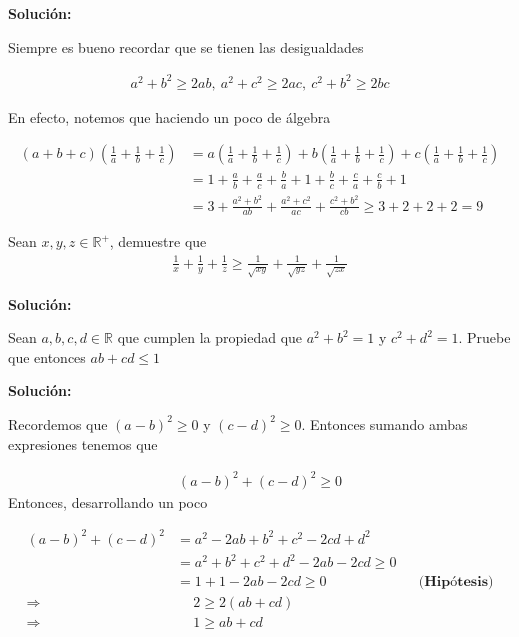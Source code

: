 \documentclass[12pt]{book}
\begin{document}
\textbf{Solución:}

Siempre es bueno recordar que se tienen las desigualdades

\begin{align*}
    a^2+b^2\geq2 ab, \ a^2+c^2\geq 2ac, \ c^2+b^2 \geq 2 bc
\end{align*}

En efecto, notemos que haciendo un poco de álgebra

\begin{align*}
    (a+b+c)\left(\frac{1}{a}+\frac{1}{b}+\frac{1}{c}\right)
    &=a \left(\frac{1}{a}+\frac{1}{b}+\frac{1}{c}\right)+b\left(\frac{1}{a}+\frac{1}{b}+\frac{1}{c}\right)+c\left(\frac{1}{a}+\frac{1}{b}+\frac{1}{c}\right) \\
    &=1+ \frac{a}{b}+\frac{a}{c}+\frac{b}{a}+1+\frac{b}{c}+\frac{c}{a}+\frac{c}{b}+1 \\
    &=3+\frac{a^2+b^2}{ab}+\frac{a^2+c^2}{ac}+\frac{c^2+b^2}{cb}\geq 3+2+2+2=9    
\end{align*}

\begin{prob}{}{}
Sean $x,y,z \in \mathbb{R}^+$, demuestre que
\begin{align*}
    \frac{1}{x}+\frac{1}{y}+\frac{1}{z} \geq \frac{1}{\sqrt{xy}}+\frac{1}{\sqrt{yz}}+\frac{1}{\sqrt{zx}}
\end{align*}
\end{prob}
\textbf{Solución:}




\begin{prob}{}{}
    Sean $a,b,c,d \in \mathbb{R}$ que cumplen la propiedad que $a^2+b^2=1$ y $c^2+d^2=1$. Pruebe que entonces $ab+cd\leq1$ 
\end{prob}
\textbf{Solución:}

Recordemos que $(a-b)^2\geq0$ y $(c-d)^2\geq 0$. Entonces sumando ambas expresiones tenemos que 

\begin{align*}
    (a-b)^2+(c-d)^2 \geq 0
\end{align*}
Entonces, desarrollando un poco

\begin{align*}
    (a-b)^2+(c-d)^2&=a^2-2ab+b^2+c^2-2cd+d^2 \\
    &=a^2+b^2+c^2+d^2-2ab-2cd \geq 0 \\
     &=1+1-2ab-2cd \geq 0 && \textbf{(Hipótesis)} \\ 
    \Longrightarrow&\quad \  2\geq 2 (ab+cd) \\ 
   \Longrightarrow& \quad \ 1\geq ab+cd
\end{align*}
\end{document}
